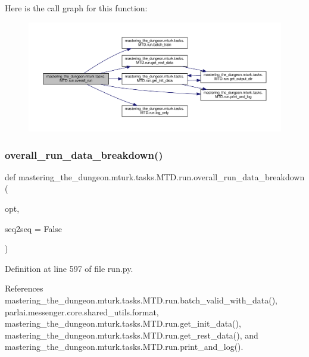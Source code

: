 Here is the call graph for this function\+:
\nopagebreak
\begin{figure}[H]
\begin{center}
\leavevmode
\includegraphics[width=350pt]{namespacemastering__the__dungeon_1_1mturk_1_1tasks_1_1MTD_1_1run_aba096c2ad490fe6481c7a7ff36e60784_cgraph}
\end{center}
\end{figure}
\mbox{\label{namespacemastering__the__dungeon_1_1mturk_1_1tasks_1_1MTD_1_1run_a4f7dcbc08b7657c55f7b5facfdda4488}} 
\subsubsection{\texorpdfstring{overall\+\_\+run\+\_\+data\+\_\+breakdown()}{overall\_run\_data\_breakdown()}}
{\footnotesize\ttfamily def mastering\+\_\+the\+\_\+dungeon.\+mturk.\+tasks.\+M\+T\+D.\+run.\+overall\+\_\+run\+\_\+data\+\_\+breakdown (\begin{DoxyParamCaption}\item[{}]{opt,  }\item[{}]{seq2seq = {\ttfamily False} }\end{DoxyParamCaption})}



Definition at line 597 of file run.\+py.



References mastering\+\_\+the\+\_\+dungeon.\+mturk.\+tasks.\+M\+T\+D.\+run.\+batch\+\_\+valid\+\_\+with\+\_\+data(), parlai.\+messenger.\+core.\+shared\+\_\+utils.\+format, mastering\+\_\+the\+\_\+dungeon.\+mturk.\+tasks.\+M\+T\+D.\+run.\+get\+\_\+init\+\_\+data(), mastering\+\_\+the\+\_\+dungeon.\+mturk.\+tasks.\+M\+T\+D.\+run.\+get\+\_\+rest\+\_\+data(), and mastering\+\_\+the\+\_\+dungeon.\+mturk.\+tasks.\+M\+T\+D.\+run.\+print\+\_\+and\+\_\+log().

